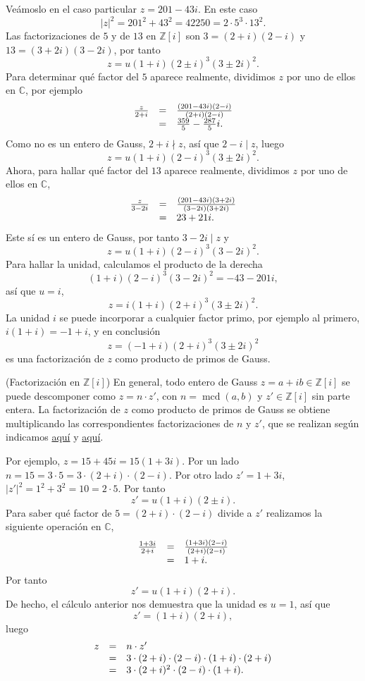 Veámoslo en el caso particular \(z=201-43i\). En este caso
\[|z|^2=201^2+43^2=42250=2\cdot 5^3 \cdot 13^2.\] Las factorizaciones de
\(5\) y de \(13\) en \(\mathbb{Z}[i]\) son \(3=(2+i)(2-i)\) y
\(13=(3+2i)(3-2i)\), por tanto \[z=u(1+i)(2\pm i)^3(3\pm 2i)^2.\] Para
determinar qué factor del \(5\) aparece realmente, dividimos \(z\) por
uno de ellos en \(\mathbb{C}\), por ejemplo \[
\begin{array}{rcl}
\frac{z}{2+i}&=&\frac{(201-43i)(2-i)}{(2+i)(2-i)}\cr
&=&\frac{359}{5}-\frac{287}{5}i.
\end{array}
\] Como no es un entero de Gauss, \(2+i\nmid z\), así que \(2-i\mid z\),
luego \[z=u(1+i)(2-i)^3(3\pm 2i)^2.\] Ahora, para hallar qué factor del
\(13\) aparece realmente, dividimos \(z\) por uno de ellos en
\(\mathbb{C}\), \[
\begin{array}{rcl}
\frac{z}{3-2i}&=&\frac{(201-43i)(3+2i)}{(3-2i)(3+2i)}\cr
&=&23+21i.
\end{array}
\] Este sí es un entero de Gauss, por tanto \(3-2i\mid z\) y
\[z=u(1+i)(2-i)^3(3- 2i)^2.\] Para hallar la unidad, calculamos el
producto de la derecha \[
(1+i)(2-i)^3(3- 2i)^2=-43-201i,
\] así que \(u=i\), \[z=i(1+i)(2+i)^3(3\pm 2i)^2.\] La unidad \(i\) se
puede incorporar a cualquier factor primo, por ejemplo al primero,
\(i(1+i)=-1+i\), y en conclusión \[z=(-1+i)(2+i)^3(3\pm 2i)^2\] es una
factorización de \(z\) como producto de primos de Gauss. 

\textrm{\normalfont (Factorización en $\mathbb Z[i]$)} En
general, todo entero de Gauss \(z=a+ib\in\mathbb{Z}[i]\) se puede
descomponer como \(z=n\cdot z'\), con \(n=\operatorname{mcd}(a,b)\) y
\(z'\in\mathbb{Z}[i]\) sin parte entera. La factorización de \(z\) como
producto de primos de Gauss se obtiene multiplicando las
correspondientes factorizaciones de \(n\) y \(z'\), que se realizan
según indicamos \protect\hyperlink{exm:integer}{aquí} y
\protect\hyperlink{exm:nointeger}{aquí}.

Por ejemplo, \(z=15+45i=15(1+3i)\). Por un lado
\(n=15=3\cdot 5=3\cdot(2+i)\cdot (2-i)\). Por otro lado \(z'=1+3i\),
\(|z'|^2=1^2+3^2=10=2\cdot 5\). Por tanto \[z'=u(1+i)(2\pm i).\] Para
saber qué factor de \(5=(2+i)\cdot (2-i)\) divide a \(z'\) realizamos la
siguiente operación en \(\mathbb{C}\), \[
\begin{array}{rcl}
\frac{1+3i}{2+i}&=&\frac{(1+3i)(2-i)}{(2+i)(2-i)}\cr
&=&1+i.
\end{array}
\] Por tanto \[z'=u(1+i)(2+ i).\] De hecho, el cálculo anterior nos
demuestra que la unidad es \(u=1\), así que \[z'=(1+i)(2+ i),\] luego \[
\begin{array}{rcl}
z&=&n\cdot z'\cr
&=&3\cdot(2+i)\cdot (2-i)\cdot(1+i)\cdot (2+ i)\cr
&=&3\cdot(2+i)^2\cdot (2-i)\cdot(1+i).
\end{array}
\] 

